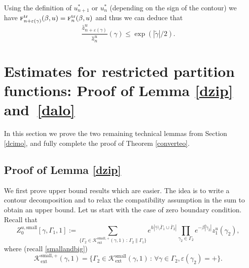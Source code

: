 \documentclass[JEP,XML,SOM,Unicode, NoFloatCountersInSection]{cedram}
\let\mathcal\mathscr
\newcommand{\sep}{\,:\,}
\numberwithin{equation}{section}
\theoremstyle{plain}
\theoremstyle{definition}
\newcommand{\ext}{\mathrm{ext}}
\newcommand{\sm}{\mathrm{small}}
\newcommand{\cK}{{\ensuremath{\mathcal K}} }
\newcommand{\gb}{\beta}
\newcommand{\gep}{\varepsilon}
\newcommand{\gG}{\Gamma}
\newcommand{\tr}{\mathrm{tr}}
\newcommand{\tf}{\textsc{f}}
\begin{document}
Using the definition of $u^*_{n+1}$ or $u^*_n$ (depending on the sign of the contour)
we have $\tf^{\tr}_{n+\gep(\gamma)}(\gb,u)=\tf^{\tr}_{n}(\gb,u)$ and thus we can deduce that
\begin{equation*}
\frac{ \bar z^u_{n+\gep(\gamma)}}{\bar z^u_{n}}(\gamma)\le \exp\left(|\tilde \gamma|/2\right).
\end{equation*}

\section{Estimates for restricted partition functions: Proof of Lemma \ref{dzip} and~\ref{dalo}}\label{secrestrict}

In this section we prove the two remaining technical lemmas from Section \ref{dcimo}, and fully complete the proof of Theorem \ref{converteo}.

\subsection{Proof of Lemma \ref{dzip}}
We first prove upper bound results which are easier. The idea is to write a contour decomposition and to relax the compatibility assumption in the sum to obtain an upper bound.
Let us start with the case of zero boundary condition.
Recall that
\begin{equation*}%
Z^{u,\sm}_{0}[\gamma,\gG_1,1]:= \sum_{\{ \gG_2 \in \cK^{\sm,+}_{\ext}(\gamma,1) \sep \gG_2 \parallel \gG_1\}} e^{h|\bar \gamma \setminus \bar \gG_1\cup \bar \gG_2|} \prod_{\gamma_2\in \gG_2 }
e^{-\gb |\tilde\gamma_2|}
z^u_{1}(\gamma_2),
\end{equation*}
where (recall \eqref{smallandbig})
\[
\cK^{\sm,+}_{\ext}(\gamma,1)=\{ \gG_2\in \cK^{\sm}_{\ext}(\gamma,1) \sep \forall \gamma\in \gG_2, \gep(\gamma_2)=+\}.
\]
\end{document}
